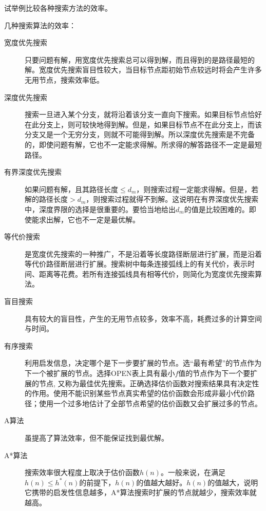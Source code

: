 \begin{question}
试举例比较各种搜索方法的效率。
\end{question}	
\begin{solution}
几种搜索算法的效率：
	\begin{description}
		\item[宽度优先搜索] 只要问题有解，用宽度优先搜索总可以得到解，而且得到的是路径最短的解。宽度优先搜索盲目性较大，当目标节点距初始节点较远时将会产生许多无用节点，搜索效率低。
		\item[深度优先搜索] 搜索一旦进入某个分支，就将沿着该分支一直向下搜索。如果目标节点恰好在此分支上，则可较快地得到解。但是，如果目标节点不在此分支上，而该分支又是一个无穷分支，则就不可能得到解。所以深度优先搜索是不完备的，即使问题有解，它也不一定能求得解。所求得的解答路径不一定是最短路径。
		\item[有界深度优先搜索] 如果问题有解，且其路径长度$\leq d_m$，则搜索过程一定能求得解。但是，若解的路径长度$> d_m$，则搜索过程就得不到解。这说明在有界深度优先搜索中，深度界限的选择是很重要的。要恰当地给出$d_m$的值是比较困难的。即使能求出解，它也不一定是最优解。
		\item[等代价搜索] 是宽度优先搜索的一种推广，不是沿着等长度路径断层进行扩展，而是沿着等代价路径断层进行扩展。搜索树中每条连接弧线上的有关代价，表示时间、距离等花费。若所有连接弧线具有相等代价，则简化为宽度优先搜索算法。
		\item[盲目搜索] 具有较大的盲目性，产生的无用节点较多，效率不高，耗费过多的计算空间与时间。
		\item[有序搜索] 利用启发信息，决定哪个是下一步要扩展的节点。选``最有希望''的节点作为下一个被扩展的节点。选择OPEN表上具有最小$f$值的节点作为下一个要扩展的节点, 又称为最佳优先搜索。正确选择估价函数对搜索结果具有决定性的作用。使用不能识别某些节点真实希望的估价函数会形成非最小代价路径；使用一个过多地估计了全部节点希望的估价函数又会扩展过多的节点。 
		\item[A算法] 虽提高了算法效率，但不能保证找到最优解。
		\item[A*算法] 搜索效率很大程度上取决于估价函数$h(n)$。一般来说，在满足$h(n)\leq h^*(n)$的前提下，$h(n)$的值越大越好。$h(n)$的值越大，说明它携带的启发性信息越多，A*算法搜索时扩展的节点就越少，搜索效率就越高。
	\end{description}

\end{solution}

